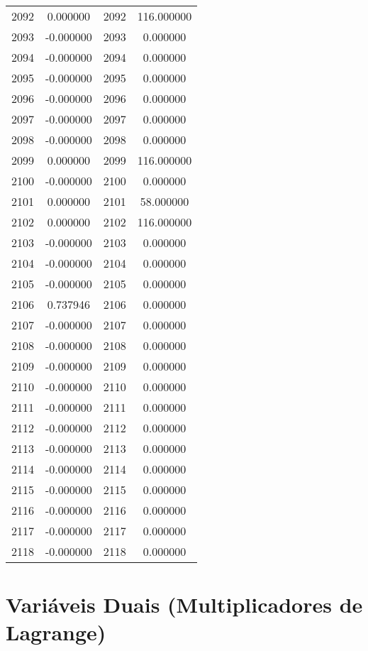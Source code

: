 \documentclass[12pt]{article}
\begin{document}
\begin{longtable}{@{}cccc@{}}
2092 & 0.000000 & 2092 & 116.000000 \\
2093 & -0.000000 & 2093 & 0.000000 \\
2094 & -0.000000 & 2094 & 0.000000 \\
2095 & -0.000000 & 2095 & 0.000000 \\
2096 & -0.000000 & 2096 & 0.000000 \\
2097 & -0.000000 & 2097 & 0.000000 \\
2098 & -0.000000 & 2098 & 0.000000 \\
2099 & 0.000000 & 2099 & 116.000000 \\
2100 & -0.000000 & 2100 & 0.000000 \\
2101 & 0.000000 & 2101 & 58.000000 \\
2102 & 0.000000 & 2102 & 116.000000 \\
2103 & -0.000000 & 2103 & 0.000000 \\
2104 & -0.000000 & 2104 & 0.000000 \\
2105 & -0.000000 & 2105 & 0.000000 \\
2106 & 0.737946 & 2106 & 0.000000 \\
2107 & -0.000000 & 2107 & 0.000000 \\
2108 & -0.000000 & 2108 & 0.000000 \\
2109 & -0.000000 & 2109 & 0.000000 \\
2110 & -0.000000 & 2110 & 0.000000 \\
2111 & -0.000000 & 2111 & 0.000000 \\
2112 & -0.000000 & 2112 & 0.000000 \\
2113 & -0.000000 & 2113 & 0.000000 \\
2114 & -0.000000 & 2114 & 0.000000 \\
2115 & -0.000000 & 2115 & 0.000000 \\
2116 & -0.000000 & 2116 & 0.000000 \\
2117 & -0.000000 & 2117 & 0.000000 \\
2118 & -0.000000 & 2118 & 0.000000 \\

\end{longtable}

\section{Variáveis Duais (Multiplicadores de Lagrange)}
\end{document}
